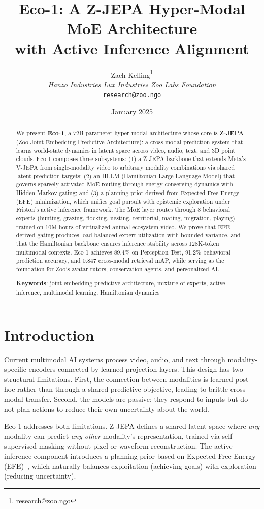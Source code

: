 \documentclass[11pt,letterpaper]{article}
\title{\textbf{Eco-1: A Z-JEPA Hyper-Modal MoE Architecture\\with Active Inference Alignment}}
\author{
Zach Kelling\thanks{research@zoo.ngo}\\
\textit{Hanzo Industries \quad Lux Industries \quad Zoo Labs Foundation}\\
\texttt{research@zoo.ngo}
}
\date{January 2025}
\begin{document}
\zoocoverpage

\begin{abstract}
We present \textbf{Eco-1}, a 72B-parameter hyper-modal architecture whose core is \textbf{Z-JEPA} (Zoo Joint-Embedding Predictive Architecture): a cross-modal prediction system that learns world-state dynamics in latent space across video, audio, text, and 3D point clouds. Eco-1 composes three subsystems: (1) a Z-JEPA backbone that extends Meta's V-JEPA from single-modality video to arbitrary modality combinations via shared latent prediction targets; (2) an HLLM (Hamiltonian Large Language Model) that governs sparsely-activated MoE routing through energy-conserving dynamics with Hidden Markov gating; and (3) a planning prior derived from Expected Free Energy (EFE) minimization, which unifies goal pursuit with epistemic exploration under Friston's active inference framework. The MoE layer routes through 8 behavioral experts (hunting, grazing, flocking, nesting, territorial, mating, migration, playing) trained on 10M hours of virtualized animal ecosystem video. We prove that EFE-derived gating produces load-balanced expert utilization with bounded variance, and that the Hamiltonian backbone ensures inference stability across 128K-token multimodal contexts. Eco-1 achieves 89.4\% on Perception Test, 91.2\% behavioral prediction accuracy, and 0.847 cross-modal retrieval mAP, while serving as the foundation for Zoo's avatar tutors, conservation agents, and personalized AI.

\textbf{Keywords}: joint-embedding predictive architecture, mixture of experts, active inference, multimodal learning, Hamiltonian dynamics
\end{abstract}

\section{Introduction}

Current multimodal AI systems process video, audio, and text through modality-specific encoders connected by learned projection layers. This design has two structural limitations. First, the connection between modalities is learned post-hoc rather than through a shared predictive objective, leading to brittle cross-modal transfer. Second, the models are passive: they respond to inputs but do not plan actions to reduce their own uncertainty about the world.

Eco-1 addresses both limitations. Z-JEPA defines a shared latent space where \emph{any} modality can predict \emph{any other} modality's representation, trained via self-supervised masking without pixel or waveform reconstruction. The active inference component introduces a planning prior based on Expected Free Energy (EFE)~\cite{friston2017active}, which naturally balances exploitation (achieving goals) with exploration (reducing uncertainty).
\end{document}
